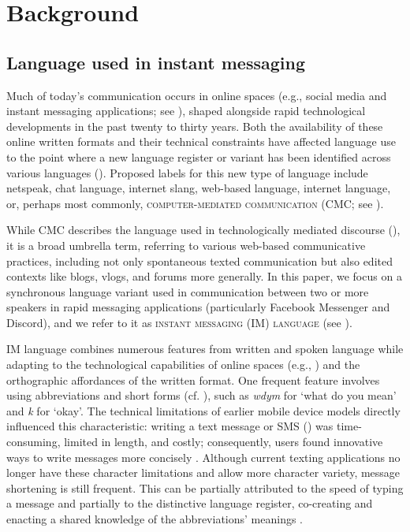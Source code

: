 \documentclass[output=paper]{langscibook}
\begin{document}
\section{Background}\label{sec:vihmanetal:2}
\subsection{Language used in instant messaging}

Much of today’s communication occurs in online spaces (e.g., social media and instant messaging applications; see \citealt{ThurlowMroczek2011}), shaped alongside rapid technological developments in the past twenty to thirty years. Both the availability of these online written formats and their technical constraints have affected language use to the point where a new language register or variant has been identified across various languages (\citealt{CollotBelmore1996, Androutsopoulos2014, McCulloch2019}). Proposed labels for this new type of language include netspeak, chat language, internet slang, web-based language, internet language, or, perhaps most commonly, \textsc{computer-mediated} \textsc{communication} (CMC; see \citealt{Herring1996, Crystal2001, Androutsopoulos2006}). 

While CMC describes the language used in technologically mediated discourse (\citealt{AndroutsopoulosEtAl2013, Vettorel2014}), it is a broad umbrella term, referring to various web-based communicative practices, including not only spontaneous texted communication but also edited contexts like blogs, vlogs, and forums more generally. In this paper, we focus on a synchronous language variant used in communication between two or more speakers in rapid messaging applications (particularly Facebook Messenger and Discord), and we refer to it as \textsc{instant} \textsc{messaging} (IM) \textsc{language} (see \citealt{Herring2007, TagliamonteDenis2008, Baron2010}).

IM language combines numerous features from written and spoken language while adapting to the technological capabilities of online spaces (e.g.,   \citealt{PalfreymanAlKhalil2003}) and the orthographic affordances of the written format. One frequent feature involves using abbreviations and short forms (cf. \citealt{ThurlowBrown2003, TagliamonteDenis2008}), such as \textit{wdym} for ‘what do you mean’ and \textit{k} for ‘okay’. The technical limitations of earlier mobile device models directly influenced this characteristic: writing a text message or \textsc{SMS} (\citealt{HardAfSegerstad2005, Ling2005}) was time-consuming, limited in length, and costly; consequently, users found innovative ways to write messages more concisely \citep{Crystal2009}. Although current texting applications no longer have these character limitations and allow more character variety, message shortening is still frequent. This can be partially attributed to the speed of typing a message and partially to the distinctive language register, co-creating and enacting a shared knowledge of the abbreviations’ meanings \citep{Tagliamonte2016sick}.
\end{document}

